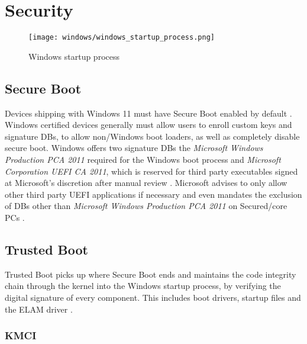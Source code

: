 
\section{Security}


\begin{figure}[htb]
    \centering
    \texttt{[image: windows/windows\_startup\_process.png]}
    \caption{Windows startup process \cite{microsoft-secure-the-windows-boot-process}}
    \label{fig:windows-startup-process}
\end{figure}

\subsection{Secure Boot}

Devices shipping with Windows 11 must have Secure Boot enabled by default \cite{microsoft-windows-minimum-hardware-requirements-overview}.
Windows certified devices generally must allow users to enroll custom keys and signature \acp{DB}, to allow non\-/Windows boot loaders, as well as completely disable secure boot.
Windows offers two signature \acp{DB} the \emph{Microsoft Windows Production PCA 2011} required for the Windows boot process and \emph{Microsoft Corporation \ac{UEFI} \ac{CA} 2011}, which is reserved for third party executables signed at Microsoft's discretion after manual review  \cite{microsoft-uefi-signing}.
Microsoft advises to only allow other third party \ac{UEFI} applications if necessary and even mandates the exclusion of \acp{DB} other than \emph{Microsoft Windows Production PCA 2011} on Secured\-/core \acp{PC} \cite{microsoft-secure-the-windows-boot-process}.

\subsection{Trusted Boot}

Trusted Boot picks up where Secure Boot ends and maintains the code integrity chain through the kernel into the Windows startup process, by verifying the digital signature of every component.
This includes boot drivers, startup files and the \ac{ELAM} driver \cite{microsoft-trusted-boot}.

\subsubsection{KMCI}
\cite{understanding-windows-trusted-boot}
